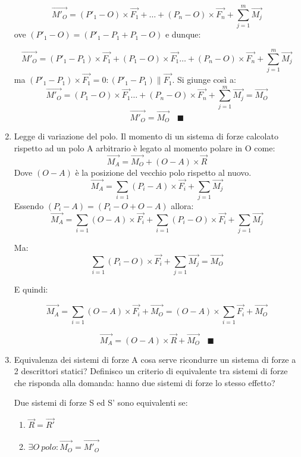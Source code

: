 \documentclass{article}
\begin{document}
\begin{adjustwidth}{2in}{}
\begin{enumerate}
	\[ 
	\vec{M'_{O}} = (P'_{1}-O)\times \vec{F_{1}} + \dots + (P_{n}-O)\times \vec{F_{n}} + \sum_{j=1}^{m} \vec{M_{j}}
	\]
	ove $(P'_{1}-O) = (P'_{1} - P_{1} + P_{1} - O)$ e dunque:
	
		\[ 
	\vec{M'_{O}} = (P'_{1}-P_{1})\times \vec{F_{1}} + (P_{1}-O)\times \vec{F_{1}} \dots + (P_{n}-O)\times \vec{F_{n}} + \sum_{j=1}^{m} \vec{M_{j}}
	\]
ma $ (P'_{1}-P_{1}) \times \vec{F_{1}} = 0 : (P'_{1}-P_{1})\parallel\vec{F_{1}}$. \newline
Si giunge così a: 
	\[ 
\vec{M'_{O}} = (P_{1}-O)\times \vec{F_{1}} \dots + (P_{n}-O)\times \vec{F_{n}} + \sum_{j=1}^{m} \vec{M_{j}} = \vec{M_{O}}
\]
\[ \vec{M'_{O}} = \vec{M_{O}} ~~~~ \blacksquare \]

\item Legge di variazione del polo. \newline
Il momento di un sistema di forze calcolato rispetto ad un polo A arbitrario è legato al momento polare in O come: 
\[ 
\vec{M_{A}}=\vec{M_{O}} + (O-A)\times \vec{R}
\]
Dove $(O-A)$ è la posizione del vecchio polo rispetto al nuovo.
\[ 
\vec{M_{A}}= \sum_{i=1}(P_{i} - A) \times \vec{F_{i}} + \sum_{j=1}\vec{M_{j}}
\]
Essendo $(P_{i} - A)=(P_{i}-O+O-A)$ allora: 
\[ 
\vec{M_{A}}= \sum_{i=1}(O - A) \times \vec{F_{i}} + \sum_{i=1}(P_{i} - O) \times \vec{F_{i}} + \sum_{j=1}\vec{M_{j}}
\]

Ma:
\[ 
\sum_{i=1}(P_{i} - O) \times \vec{F_{i}} + \sum_{j=1}\vec{M_{j}} = \vec{M_{O}}
\] 

E quindi: 

\[ 
\vec{M_{A}}= \sum_{i=1}(O - A) \times \vec{F_{i}} + \vec{M_{O}} = (O - A) \times \sum_{i=1}\vec{F_{i}} + \vec{M_{O}} 
\]

\[ 
\vec{M_{A}} = (O - A) \times \vec{R} + \vec{M_{O}} ~~~~ 
\blacksquare\]

\item Equivalenza dei sistemi di forze \newline
A cosa serve ricondurre un sistema di forze a 2 descrittori statici? Definisco un criterio di equivalente tra sistemi di forze che risponda alla domanda: hanno due sistemi di forze lo stesso effetto? 

Due sistemi di forze S ed S' sono equivalenti se: 
 \begin{enumerate}
 	\item $\vec{R}=\vec{R'}$
 	\item $\exists O ~ polo : \vec{M_{O}}=\vec{M'_{O}}$
 	\end{enumerate}
 

\end{enumerate}
\end{adjustwidth}
\end{document}
